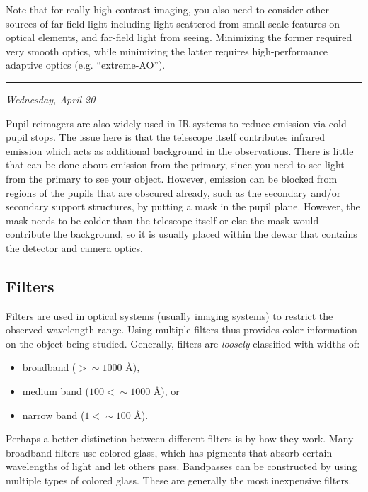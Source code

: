\documentclass[12pt]{article}
\newcommand{\mydate}[1]{
    \begin{flushright}
        \rule{\textwidth}{0.4pt} %
        \small\hfill\textit{#1}
    \end{flushright}}
\begin{document}
Note that for really high contrast imaging, you also need to consider
other sources of far-field light including light scattered from
small-scale features on optical elements, and far-field light from
seeing. Minimizing the former required very smooth optics, while
minimizing the latter requires high-performance adaptive optics (e.g.
``extreme-AO'').

\mydate{Wednesday, April 20}

Pupil reimagers are also widely used in IR systems to reduce emission via cold
pupil stops. The issue here is that the telescope itself contributes infrared
emission which acts as additional background in the observations. There is
little that can be done about emission from the primary, since you need to see
light from the primary to see your object. However, emission can be blocked
from regions of the pupils that are obscured already, such as the secondary
and/or secondary support structures, by putting a mask in the pupil plane.
However, the mask needs to be colder than the telescope itself or else the mask
would contribute the background, so it is usually placed within the dewar that
contains the detector and camera optics.

\subsection{Filters}
Filters are used in optical systems (usually imaging systems) to
restrict the observed wavelength range. Using multiple filters thus
provides color information on the object being studied. Generally,
filters are \emph{loosely} classified with widths of:
\begin{itemize}
    \item broadband ($ > \sim 1000$ \AA{}),
    \item medium band ($100 < \sim 1000$ \AA{}), or
    \item narrow band ($1 < \sim 100$ \AA{}).
\end{itemize}

Perhaps a better distinction between different filters is by how they work.
Many broadband filters use colored glass, which has pigments that absorb
certain wavelengths of light and let others pass. Bandpasses can be constructed
by using multiple types of colored glass. These are generally the most
inexpensive filters.
\end{document}
